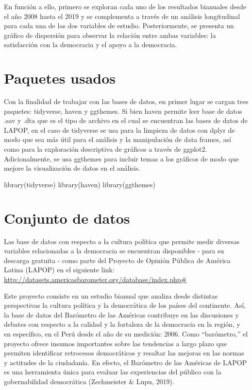\documentclass[
]{book}
\newenvironment{Shaded}{\begin{snugshade}}{\end{snugshade}}
\newcommand{\FunctionTok}[1]{\textcolor[rgb]{0.00,0.00,0.00}{#1}}
\newcommand{\NormalTok}[1]{#1}
\begin{document}
En función a ello, primero se exploran cada uno de los resultados bianuales desde el año 2008 hasta el 2019 y se complementa a través de un análisis longitudinal para cada una de las dos variables de estudio. Posteriormente, se presenta un gráfico de dispersión para observar la relación entre ambas variables: la satisfacción con la democracia y el apoyo a la democracia.

\hypertarget{paquetes-usados-3}{%
\section{Paquetes usados}\label{paquetes-usados-3}}

Con la finalidad de trabajar con las bases de datos, en primer lugar se cargan tres paquetes: tidyverse, haven y ggthemes. Si bien haven permite leer base de datos .sav y .dta que es el tipo de archivo en el cual se encuentran las bases de datos de LAPOP, en el caso de tidyverse se usa para la limpieza de datos con dplyr de modo que sea más útil para el análisis y la manipulación de data frames, así como para la exploración descriptiva de gráficos a través de ggplot2. Adicionalmente, se usa ggthemes para incluir temas a los gráficos de modo que mejore la visualización de datos en el análisis.

\begin{Shaded}
\begin{Highlighting}[]
\FunctionTok{library}\NormalTok{(tidyverse)}
\FunctionTok{library}\NormalTok{(haven)}
\FunctionTok{library}\NormalTok{(ggthemes)}
\end{Highlighting}
\end{Shaded}

\hypertarget{conjunto-de-datos}{%
\section{Conjunto de datos}\label{conjunto-de-datos}}

Las base de datos con respecto a la cultura política que permite medir diversas variables relacionadas a la democracia se encuentran disponibles - para su descarga gratuita - como parte del Proyecto de Opinión Pública de América Latina (LAPOP) en el siguiente link: \url{http://datasets.americasbarometer.org/database/index.php\#}

Este proyecto consiste en un estudio bianual que analiza desde distintas perspectivas la cultura política y la democrática de los países del continente. Así, la base de datos del Barómetro de las Américas contribuye en las discusiones y debates con respecto a la calidad y la fortaleza de la democracia en la región, y en específico, en el Perú desde el año de su medición: 2006. Como ``barómetro,'' el proyecto ofrece insumos importantes sobre las tendencias a largo plazo que permiten identificar retrocesos democráticos y resaltar las mejoras en las normas y actitudes de la ciudadanía. En efecto, el Barómetro de las Américas de LAPOP es una herramienta única para evaluar las experiencias del público con la gobernabilidad democrática (Zechmeister \& Lupu, 2019).
\end{document}
